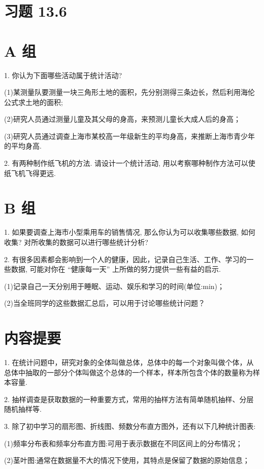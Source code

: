 \documentclass[10pt]{article}
\begin{document}
\section*{习题 13.6}

\section*{A 组}

1. 你认为下面哪些活动属于统计活动?

(1)某测量队要测量一块三角形土地的面积，先分别测得三条边长，然后利用海伦公式求土地的面积;

(2)研究人员通过测量儿童及其父母的身高，来预测儿童长大成人后的身高；

(3)研究人员通过调查上海市某校高一年级新生的平均身高，来推断上海市青少年的平均身高.

2. 有两种制作纸飞机的方法. 请设计一个统计活动, 用以考察哪种制作方法可以使纸飞机飞得更远.

\section*{B 组}

1. 如果要调查上海市小型乘用车的销售情况, 那么你认为可以收集哪些数据, 如何收集? 对所收集的数据可以进行哪些统计分析?

2. 有很多因素都会影响到一个人的健康，因此，记录自己生活、工作、学习的一些数据, 可能对你在 “健康每一天” 上所做的努力提供一些有益的启示.

(1)记录自己一天分别用于睡眠、运动、娱乐和学习的时间(单位:min)；

(2)当全班同学的这些数据汇总后，可以用于讨论哪些统计问题？

\section*{内容提要}

1. 在统计问题中，研究对象的全体叫做总体，总体中的每一个对象叫做个体，从总体中抽取的一部分个体叫做这个总体的一个样本，样本所包含个体的数量称为样本容量.

2. 抽样调查是获取数据的一种重要方式，常用的抽样方法有简单随机抽样、分层随机抽样等.

3. 除了初中学习的扇形图、折线图、频数分布直方图外，还有以下几种统计图表:

(1)频率分布表和频率分布直方图:可用于表示数据在不同区间上的分布情况；

(2)茎叶图:通常在数据量不大的情况下使用，其特点是保留了数据的原始信息；
\end{document}
